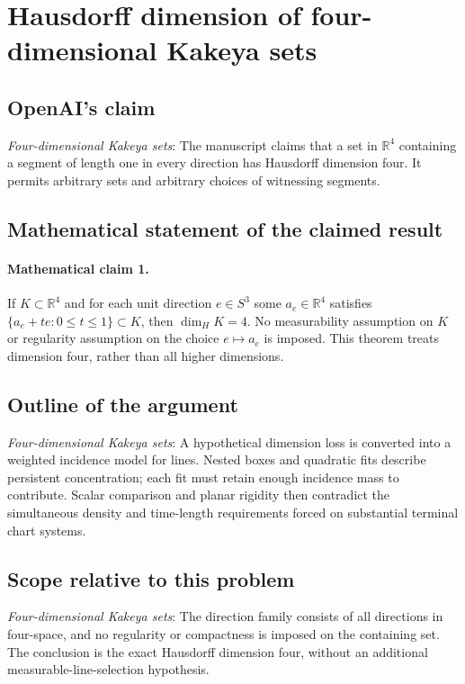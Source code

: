 \documentclass[11pt]{article}
\begin{document}
\section*{Hausdorff dimension of four-dimensional Kakeya sets}

\subsection{OpenAI's claim}
\textit{Four-dimensional Kakeya sets}: The manuscript claims that a set in $\mathbb R^4$ containing a segment of length one in every direction has Hausdorff dimension four. It permits arbitrary sets and arbitrary choices of witnessing segments.

\subsection{Mathematical statement of the claimed result}
\paragraph{Mathematical claim 1.} If $K\subset\mathbb R^4$ and for each unit direction $e\in S^3$ some $a_e\in\mathbb R^4$ satisfies $\{a_e+te:0\le t\le1\}\subset K$, then $\dim_H K=4$. No measurability assumption on $K$ or regularity assumption on the choice $e\mapsto a_e$ is imposed. This theorem treats dimension four, rather than all higher dimensions.

\subsection{Outline of the argument}
\textit{Four-dimensional Kakeya sets}: A hypothetical dimension loss is converted into a weighted incidence model for lines. Nested boxes and quadratic fits describe persistent concentration; each fit must retain enough incidence mass to contribute. Scalar comparison and planar rigidity then contradict the simultaneous density and time-length requirements forced on substantial terminal chart systems.

\subsection{Scope relative to this problem}
\textit{Four-dimensional Kakeya sets}: The direction family consists of all directions in four-space, and no regularity or compactness is imposed on the containing set. The conclusion is the exact Hausdorff dimension four, without an additional measurable-line-selection hypothesis.
\end{document}
